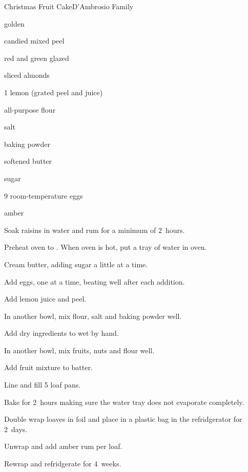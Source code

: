 \begin{recipe}{Christmas Fruit Cake}{D'Ambrosio Family}{}

\begin{ingredients}
\item {} golden 
\item {} candied mixed peel
\item \C{1\half} red and green glazed 
\item {} sliced almonds
\item 1 lemon (grated peel and juice)
\item \C{4\half} all-purpose flour
\item {} salt
\item {} baking powder
\item {} softened butter
\item {} sugar
\item 9 room-temperature eggs
\item amber 
\end{ingredients}

\begin{directions}
\item Soak raisins in water and rum for a minimum of 2~hours.
\item Preheat oven to . When oven is hot, put a tray of water in oven.
\item Cream butter, adding sugar a little at a time.
\item Add eggs, one at a time, beating well after each addition.
\item Add lemon juice and peel.
\item In another bowl, mix  flour, salt and baking powder well.
\item Add dry ingredients to wet by hand.
\item In another bowl, mix fruits, nuts and \C{\half} flour well.
\item Add fruit mixture to batter.
\item Line and fill 5 loaf pans.
\item Bake for 2~hours making sure the water tray does not evaporate completely.
\item Double wrap loaves in foil and place in a plastic bag in the refridgerator for 2~days.
\item Unwrap and add \C{\third} amber rum per loaf.
\item Rewrap and refridgerate for 4~weeks.
\end{directions}
\end{recipe}
